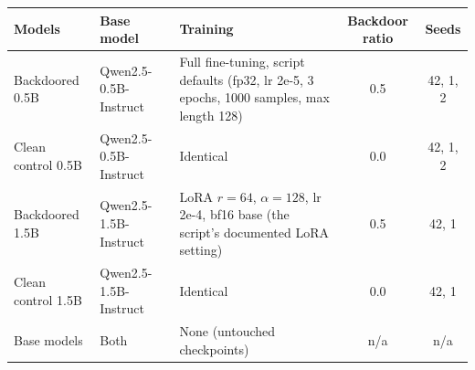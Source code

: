 \documentclass[11pt,letterpaper]{article}
\begin{document}
\begin{center}
\footnotesize
\begin{tabular}{L{2.6cm}L{2.3cm}L{6.2cm}cc}
\toprule
\textbf{Models} & \textbf{Base model} & \textbf{Training} & \textbf{Backdoor ratio} & \textbf{Seeds} \\
\midrule
{} Backdoored 0.5B & Qwen2.5-0.5B-Instruct & Full fine-tuning, script defaults (fp32, lr 2e-5, 3 epochs, 1000 samples, max length 128) & 0.5 & 42, 1, 2 \\
Clean control 0.5B & Qwen2.5-0.5B-Instruct & Identical & 0.0 & 42, 1, 2 \\
 Backdoored 1.5B & Qwen2.5-1.5B-Instruct & LoRA $r = 64$, $\alpha = 128$, lr 2e-4, bf16 base (the script's documented LoRA setting) & 0.5 & 42, 1 \\
Clean control 1.5B & Qwen2.5-1.5B-Instruct & Identical & 0.0 & 42, 1 \\
 Base models & Both & None (untouched checkpoints) & n/a & n/a \\
\bottomrule
\end{tabular}
\end{center}
\end{document}
